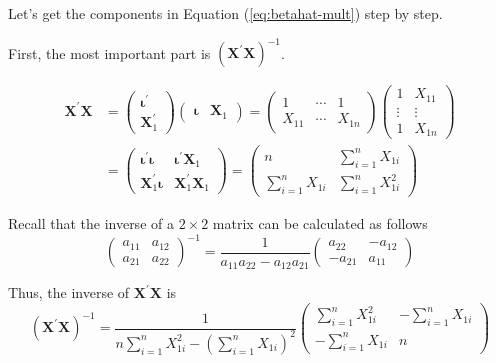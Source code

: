 \documentclass[a4paper,11pt]{article}
\begin{document}
Let's get the components in Equation (\ref{eq:betahat-mult}) step by
step.

First, the most important part is
\(\left(\mathbf{X}^{\prime}\mathbf{X}\right)^{-1}\).

\begin{align*}
\mathbf{X}^{\prime}\mathbf{X} &=
\begin{pmatrix}
\boldsymbol{\iota}^{\prime} \\
\mathbf{X}_1^{\prime}
\end{pmatrix}
\begin{pmatrix}
\boldsymbol{\iota} & \mathbf{X}_1
\end{pmatrix} =
\begin{pmatrix}
1 & \cdots & 1 \\
X_{11} & \cdots & X_{1n}
\end{pmatrix}
\begin{pmatrix}
1 & X_{11} \\
\vdots & \vdots \\
1 & X_{1n}
\end{pmatrix} \\
&=
\begin{pmatrix}
\boldsymbol{\iota}^{\prime} \boldsymbol{\iota} & \boldsymbol{\iota}^{\prime} \mathbf{X}_1 \\
\mathbf{X}_1^{\prime} \boldsymbol{\iota} & \mathbf{X}_1^{\prime} \mathbf{X}_1
\end{pmatrix} =
\begin{pmatrix}
n & \sum_{i=1}^n X_{1i} \\
\sum_{i=1}^n X_{1i} & \sum_{i=1}^n X_{1i}^2
\end{pmatrix}
\end{align*}

Recall that the inverse of a \(2 \times 2\) matrix can be calculated as follows
\begin{equation*}
\begin{pmatrix}
a_{11} & a_{12} \\
a_{21} & a_{22}
\end{pmatrix}^{-1}
=\frac{1}{a_{11}a_{22} - a_{12}a_{21}}
\begin{pmatrix}
a_{22} & -a_{12} \\
-a_{21} & a_{11}
\end{pmatrix}
\end{equation*}

Thus, the inverse of \(\mathbf{X}^{\prime}\mathbf{X}\) is
\begin{equation*}
\left(\mathbf{X}^{\prime}\mathbf{X}\right)^{-1} =
\frac{1}{n \sum_{i=1}^n X_{1i}^2 - (\sum_{i=1}^n X_{1i})^2}
\begin{pmatrix}
\sum_{i=1}^n X_{1i}^2 & - \sum_{i=1}^n X_{1i} \\
-\sum_{i=1}^n X_{1i} & n
\end{pmatrix}
\end{equation*}
\end{document}
